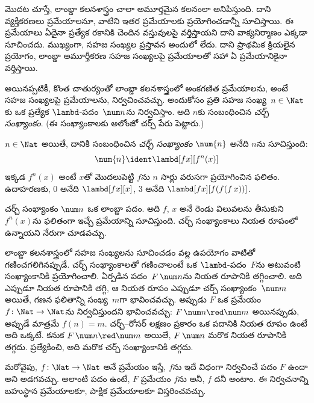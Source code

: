 \documentclass[../../../include/open-logic-section]{subfiles}
\begin{document}

మొదట చూస్తే, లాంబ్డా కలనశాస్త్రం చాలా అమూర్తమైన కలనంలా
అనిపిస్తుంది. దాని వ్యక్తీకరణలు ప్రమేయాలనూ, వాటిని ఇతర ప్రమేయాలకు
ప్రయోగించడాన్నీ సూచిస్తాయి. ఈ ప్రమేయాలు ఏదైనా ప్రత్యేక రకానికి చెందిన
వస్తువులపై వర్తిస్తాయని దాని వాక్యనిర్మాణం ఎక్కడా సూచించదు.
ముఖ్యంగా, సహజ సంఖ్యల ప్రస్తావన అందులో లేదు. దాని ప్రాథమిక
క్రియలైన ప్రయోగం, లాంబ్డా అమూర్తీకరణ సహజ సంఖ్యలపై
ప్రమేయాలతో సహా ఏ ప్రమేయానికైనా వర్తిస్తాయి.

అయినప్పటికీ, కొంత చాతుర్యంతో లాంబ్డా కలనశాస్త్రంలో
అంకగణిత ప్రమేయాలను, అంటే సహజ సంఖ్యలపై ప్రమేయాలను,
నిర్వచించవచ్చు. అందుకోసం ప్రతి సహజ సంఖ్య~$n \in
\Nat$కు ఒక ప్రత్యేక $\lambd$-పదం~$\num n$ను నిర్వచిస్తాం.
అది $n$కు సంబంధించిన \emph{చర్చ్ సంఖ్యాంకం}.
(ఈ సంఖ్యాంకాలకు అలోంజో చర్చ్ పేరు పెట్టారు.)

\begin{defn}
  $n \in \Nat$ అయితే, దానికి సంబంధించిన \emph{చర్చ్ సంఖ్యాంకం}
  $\num{n}$ అనేది $n$ను సూచిస్తుంది:
  \[
    \num{n} \ident \lambd[fx][f^n(x)]
  \]
  ఇక్కడ $f^n(x)$ అంటే $x$తో మొదలుపెట్టి $f$ను $n$ సార్లు
  వరుసగా ప్రయోగించిన ఫలితం. ఉదాహరణకు, $\num{0}$ అనేది
  $\lambd[fx][x]$, $\num{3}$ అనేది
  $\lambd[fx][f(f(f\,x))]$.
\end{defn}

చర్చ్ సంఖ్యాంకం $\num n$ ఒక లాంబ్డా పదం. అది $f$, $x$ అనే
రెండు విలువలను తీసుకుని $f^n(x)$ను ఫలితంగా ఇచ్చే
ప్రమేయాన్ని సూచిస్తుంది. చర్చ్ సంఖ్యాంకాలు నియత రూపంలో
ఉన్నాయని నేరుగా చూడవచ్చు.

లాంబ్డా కలనశాస్త్రంలో సహజ సంఖ్యలను సూచించడం వల్ల ఉపయోగం
వాటితో గణించగలిగినప్పుడే. చర్చ్ సంఖ్యాంకాలతో గణించాలంటే
ఒక $\lambd$-పదం~$F$ను అటువంటి సంఖ్యాంకానికి ప్రయోగించాలి. ఏర్పడిన
పదం~$F\, \num n$ను నియత రూపానికి తగ్గించాలి. అది ఎప్పుడూ
నియత రూపానికి తగ్గి, ఆ నియత రూపం ఎప్పుడూ చర్చ్
సంఖ్యాంకం~$\num m$ అయితే, గణన ఫలితాన్ని సంఖ్య~$m$గా
భావించవచ్చు. అప్పుడు $F$ ఒక ప్రమేయం
$f\colon \Nat \to \Nat$ను నిర్వచిస్తుందని భావించవచ్చు:
$F\, \num n \red \num m$ అయినప్పుడు, అప్పుడే మాత్రమే $f(n)=m$.
చర్చ్--రోసర్ లక్షణం ప్రకారం ఒక పదానికి నియత రూపం ఉంటే
అది ఒక్కటే. కనుక $F\, \num n \red \num m$ అయితే,
$F \, \num n$ మరొక నియత రూపానికి తగ్గదు. ప్రత్యేకించి,
అది మరొక చర్చ్ సంఖ్యాంకానికి తగ్గదు.

మరోవైపు, $f\colon \Nat \to \Nat$ అనే ప్రమేయం ఇస్తే,
$f$ను ఇదే విధంగా నిర్వచించే పదం $F$ ఉందా అని అడగవచ్చు.
అలాంటి పదం ఉంటే, $F$ ప్రమేయం $f$ను \emph{}
అనీ, $f$ దనీ అంటాం.
ఈ నిర్వచనాన్ని బహుస్థాన ప్రమేయాలకూ, పాక్షిక ప్రమేయాలకూ విస్తరించవచ్చు.
\end{document}
